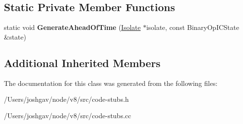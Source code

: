 \subsection*{Static Private Member Functions}
\begin{DoxyCompactItemize}
\item 
static void {\bfseries Generate\+Ahead\+Of\+Time} (\hyperlink{classv8_1_1internal_1_1_isolate}{Isolate} $\ast$isolate, const Binary\+Op\+I\+C\+State \&state)\hypertarget{classv8_1_1internal_1_1_binary_op_i_c_stub_a30259ecf00d56311668e703e70e339d3}{}\label{classv8_1_1internal_1_1_binary_op_i_c_stub_a30259ecf00d56311668e703e70e339d3}

\end{DoxyCompactItemize}
\subsection*{Additional Inherited Members}


The documentation for this class was generated from the following files\+:\begin{DoxyCompactItemize}
\item 
/\+Users/joshgav/node/v8/src/code-\/stubs.\+h\item 
/\+Users/joshgav/node/v8/src/code-\/stubs.\+cc\end{DoxyCompactItemize}
